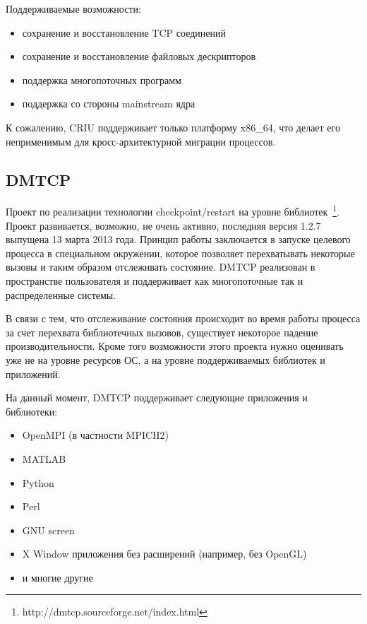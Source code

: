 Поддерживаемые возможности:

\begin{itemize}

    \item сохранение и восстановление TCP соединений
    \item сохранение и восстановление файловых дескрипторов
    \item поддержка многопоточных программ
    \item поддержка со стороны mainstream ядра

\end{itemize}

К сожалению, CRIU поддерживает только платформу x86\_64, что делает его неприменимым для кросс-архитектурной миграции процессов.

\subsection{DMTCP}

Проект по реализации технологии checkpoint/restart на уровне библиотек~\footnote{http://dmtcp.sourceforge.net/index.html}. Проект развивается, возможно, не очень активно, последняя версия 1.2.7 выпущена 13 марта 2013 года. Принцип работы заключается в запуске целевого процесса в специальном окружении, которое позволяет перехватывать некоторые вызовы и таким образом отслеживать состояние. DMTCP реализован в пространстве пользователя и поддерживает как многопоточные так и распределенные системы.

В связи с тем, что отслеживание состояния происходит во время работы процесса за счет перехвата библиотечных вызовов, существует некоторое падение производительности. Кроме того возможности этого проекта нужно оценивать уже не на уровне ресурсов ОС, а на уровне поддерживаемых библиотек и приложений.

На данный момент, DMTCP поддерживает следующие приложения и библиотеки:

\begin{itemize}

    \item OpenMPI (в частности MPICH2)
    \item MATLAB
    \item Python
    \item Perl
    \item GNU screen
    \item X Window приложения без расширений (например, без OpenGL)
    \item и многие другие

\end{itemize}

